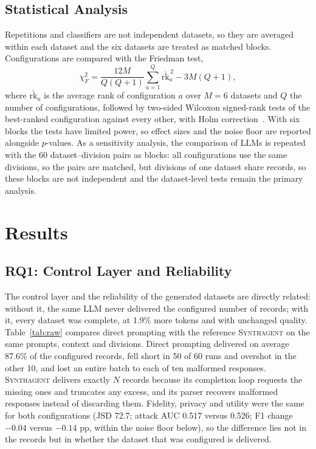 \documentclass[conference]{IEEEtran}
\newcommand{\system}{\textsc{Synthagent}\xspace}
\begin{document}
\subsection{Statistical Analysis}
Repetitions and classifiers are not independent datasets, so they are averaged within each dataset and the six datasets are treated as matched blocks. Configurations are compared with the Friedman test,
\begin{equation}
\chi^2_F=\frac{12M}{Q(Q+1)}\sum_{a=1}^{Q}\bar{\mathrm{rk}}_a^{\,2}-3M(Q+1),
\label{eq:friedman}
\end{equation}
where $\bar{\mathrm{rk}}_a$ is the average rank of configuration $a$ over $M=6$ datasets and $Q$ the number of configurations, followed by two-sided Wilcoxon signed-rank tests of the best-ranked configuration against every other, with Holm correction~\cite{demsar2006statistical,holm1979procedure}. With six blocks the tests have limited power, so effect sizes and the noise floor are reported alongside $p$-values. As a sensitivity analysis, the comparison of LLMs is repeated with the 60 dataset--division pairs as blocks: all configurations use the same divisions, so the pairs are matched, but divisions of one dataset share records, so these blocks are not independent and the dataset-level tests remain the primary analysis.

\section{Results}
\label{sec:results}
\subsection{RQ1: Control Layer and Reliability}
\label{sec:rq1}
The control layer and the reliability of the generated datasets are directly related: without it, the same LLM never delivered the configured number of records; with it, every dataset was complete, at 1.9\% more tokens and with unchanged quality. Table~\ref{tab:raw} compares direct prompting with the reference \system on the same prompts, context and divisions. Direct prompting delivered on average 87.6\% of the configured records, fell short in 50 of 60 runs and overshot in the other 10, and lost an entire batch to each of ten malformed responses. \system delivers exactly $N$ records because its completion loop requests the missing ones and truncates any excess, and its parser recovers malformed responses instead of discarding them. Fidelity, privacy and utility were the same for both configurations (JSD 72.7; attack AUC 0.517 versus 0.526; F1 change $-0.04$ versus $-0.14$ pp, within the noise floor below), so the difference lies not in the records but in whether the dataset that was configured is delivered.
\end{document}
